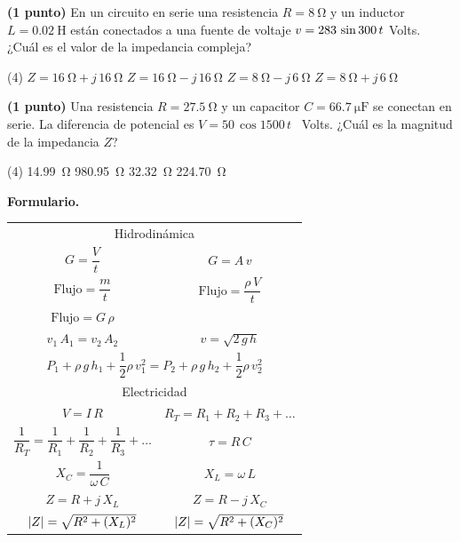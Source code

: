 \documentclass[12pt, letter]{exam}
\begin{document}
\begin{questions}
    \question \textbf{(1 punto)} En un circuito en serie una resistencia $R = \SI{8}{\ohm}$ y un inductor $L = \SI{0.02}{\henry}$ están conectados a una fuente de voltaje $v = \num 283 \, \sin 300 \, t$ Volts. ¿Cuál es el valor de la impedancia compleja?
    \begin{tasks}(4)
        \task $Z {=} \SI{16}{\ohm} + j \, \SI{16}{\ohm}$
        \task $Z {=} \SI{16}{\ohm} - j \, \SI{16}{\ohm}$
        \task $Z {=} \SI{8}{\ohm} - j \, \SI{6}{\ohm}$
        \task $Z {=} \SI{8}{\ohm} + j \, \SI{6}{\ohm}$
    \end{tasks}
    \question \textbf{(1 punto)} Una resistencia $R = \SI{27.5}{\ohm}$ y un capacitor $C = \SI{66.7}{\micro\farad}$ se conectan en serie. La diferencia de potencial es $V = \num{50} \, \cos 1500 \, t$ \, Volts. ¿Cuál es la magnitud de la impedancia $Z$?
    \begin{tasks}(4)
        \task \SI{14.99}{\ohm}
        \task \SI{980.95}{\ohm}
        \task \SI{32.32}{\ohm}
        \task \SI{224.70}{\ohm}
    \end{tasks}

\end{questions}

\vspace*{1cm}
\textbf{\huge{Formulario.}}
\begin{table}[H]
    \centering
    \setlength{\tabcolsep}{40pt}
    \renewcommand{\arraystretch}{2.5}
    \begin{tabular}{c  c}
        \multicolumn{2}{c}{Hidrodinámica} \\
        $G = \dfrac{V}{t}$ & $G = A \, v$ \\
        $\text{Flujo} = \dfrac{m}{t}$ & $\text{Flujo} = \dfrac{\rho \, V}{t}$ \\
        $\text{Flujo} = G \, \rho$ & \\
        $v_{1} \, A_{1} = v_{2} \, A_{2}$ & $v = \sqrt{2 \, g \, h}$ \\
        \multicolumn{2}{c}{$P_{1} + \rho \, g \, h_{1} + \dfrac{1}{2} \rho \, v_{1}^{2} = P_{2} + \rho \, g \, h_{2} + \dfrac{1}{2} \rho \, v_{2}^{2}$} \\ \hline
        \multicolumn{2}{c}{Electricidad} \\
        $V = I \, R$ & $R_{T} = R_{1} + R_{2} + R_{3} + \ldots$ \\
        $\dfrac{1}{R_{T}} = \dfrac{1}{R_{1}} + \dfrac{1}{R_{2}} + \dfrac{1}{R_{3}} + \ldots$ & $\tau = R \, C$ \\
        $X_{C} = \dfrac{1}{\omega \, C}$ & $X_{L} = \omega\, L$ \\
        $Z = R + j \, X_{L}$ & $Z = R - j \, X_{C}$ \\
        $\abs{Z} = \sqrt{R^{2} + (X_{L})^{2}}$ & $\abs{Z} = \sqrt{R^{2} + (X_{C})^{2}}$ \\
\end{tabular}
\end{table}
\end{document}
